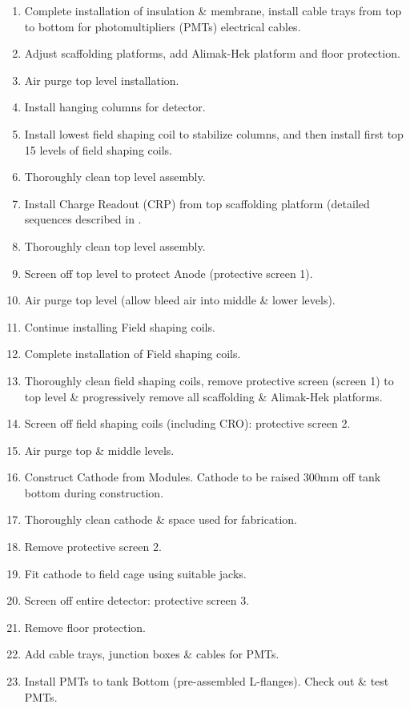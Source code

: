 \begin{enumerate}
\item{Complete installation of insulation \& membrane, install cable trays from top to bottom for photomultipliers (PMTs) electrical cables.}
\item{Adjust scaffolding platforms, add Alimak-Hek platform and floor protection.}
\item{Air purge top level installation.}
\item{Install hanging columns for detector.}
\item{Install lowest field shaping coil to stabilize columns, and then install first top 15 levels of field shaping coils.}
\item{Thoroughly clean top level assembly.}
\item{Install Charge Readout (CRP) from top scaffolding platform (detailed sequences described in \anxlbnob.}
\item{Thoroughly clean top level assembly.}
\item{Screen off top level to protect Anode (protective screen 1).}
\item{Air purge top level (allow bleed air into middle \& lower levels).}
\item{Continue installing Field shaping coils.}
\item{Complete installation of Field shaping coils.}
\item{Thoroughly clean field shaping coils, remove protective screen (screen 1) to top level \& progressively remove all scaffolding \& Alimak-Hek platforms.}
\item{Screen off field shaping coils (including CRO): protective screen 2.}
\item{Air purge top \& middle levels.}
\item{Construct Cathode from Modules. Cathode to be raised 300mm off tank bottom during construction.}
\item{Thoroughly clean cathode \& space used for fabrication.}
\item{Remove protective screen 2.}
\item{Fit cathode to field cage using suitable jacks.}
\item{Screen off entire detector: protective screen 3.}
\item{Remove floor protection.}
\item{Add cable trays, junction boxes \& cables for PMTs.}
\item{Install PMTs to tank Bottom (pre-assembled L-flanges). Check out \& test PMTs.}

\end{enumerate}

